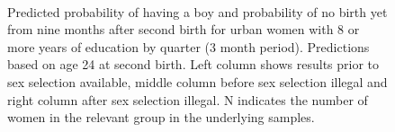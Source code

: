 \documentclass[12pt,letterpaper]{article}
\begin{document}
\begin{figure}[htpb]
{\begin{minipage}{0.31\textwidth}
        \captionsetup[subfigure]{labelformat=empty,position=top,captionskip=-1pt,farskip=-0.5pt}
        \\
        \captionsetup[subfigure]{labelformat=parens}
    \end{minipage}
}
\setcounter{subfigure}{3}
\caption{Predicted probability of having a boy and probability of
no birth yet from nine months after second birth for urban 
women with 8 or more years of education by quarter (3 month period). 
Predictions based on age 24 at second birth.
Left column shows results prior to sex selection available, middle column before
sex selection illegal and right column after sex selection illegal.
N indicates the number of women in the relevant group in the underlying samples.
}
\label{fig:results_spell3_high_urban}
\end{figure}
\end{document}
